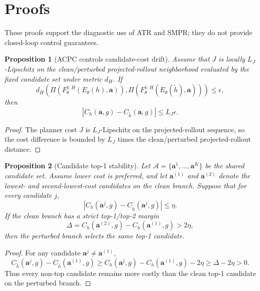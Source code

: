 \documentclass[10pt]{article}
\newtheorem{proposition}{Proposition}
\begin{document}



\clearpage
\appendix
\section{Proofs}\label{sec:appendix-acpc-proofs}

These proofs support the diagnostic use of ATR and SMPR; they do not provide closed-loop control guarantees.

\begin{proposition}[ACPC controls candidate-cost drift]\label{prop:cost-drift}
Assume that $J$ is locally $L_J$-Lipschitz on the clean/perturbed projected-rollout neighborhood evaluated by the fixed candidate set under metric $d_H$. If
\[
 d_H\!\left(\Pi(F_\theta^{1:H}(E_\theta(h),\mathbf a)),
             \Pi(F_\theta^{1:H}(E_\theta(\tilde h),\mathbf a))\right) \le \epsilon,
\]
then
\[
 |C_h(\mathbf a,g)-C_{\tilde h}(\mathbf a,g)| \le L_J\epsilon .
\]
\end{proposition}

\begin{proof}
The planner cost $J$ is $L_J$-Lipschitz on the projected-rollout sequence, so the cost difference is bounded by $L_J$ times the clean/perturbed projected-rollout distance.
\end{proof}

\begin{proposition}[Candidate top-1 stability]\label{prop:top1-stability}
Let $\mathcal A=\{\mathbf a^1,\ldots,\mathbf a^K\}$ be the shared candidate set. Assume lower cost is preferred, and let $\mathbf a^{(1)}$ and $\mathbf a^{(2)}$ denote the lowest- and second-lowest-cost candidates on the clean branch. Suppose that for every candidate $j$,
\[
 |C_h(\mathbf a^j,g)-C_{\tilde h}(\mathbf a^j,g)|\le \eta .
\]
If the clean branch has a strict top-1/top-2 margin
\[
\Delta = C_h(\mathbf a^{(2)},g)-C_h(\mathbf a^{(1)},g) > 2\eta,
\]
then the perturbed branch selects the same top-1 candidate.
\end{proposition}

\begin{proof}
For any candidate $\mathbf a^j \neq \mathbf a^{(1)}$,
\[
C_{\tilde h}(\mathbf a^j,g)-C_{\tilde h}(\mathbf a^{(1)},g)
\ge
C_h(\mathbf a^j,g)-C_h(\mathbf a^{(1)},g)-2\eta
\ge \Delta-2\eta >0 .
\]
Thus every non-top candidate remains more costly than the clean top-1 candidate on the perturbed branch.
\end{proof}
\end{document}
